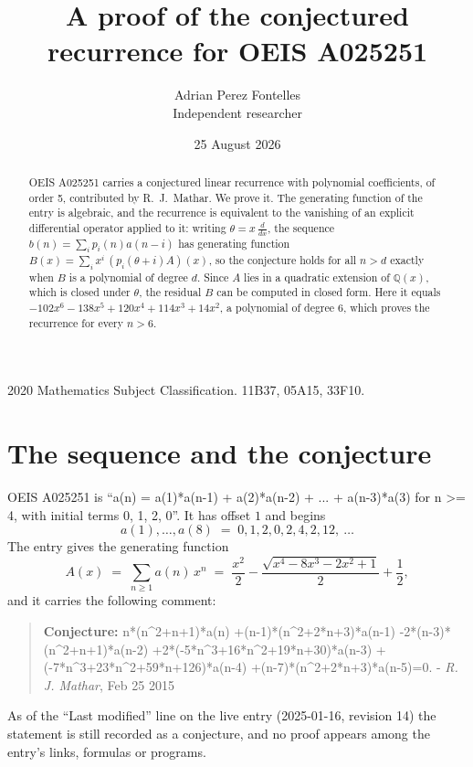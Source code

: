 \documentclass[11pt,a4paper]{article}
\title{A proof of the conjectured recurrence for OEIS A025251}
\author{Adrian Perez Fontelles\\ \small Independent researcher}
\date{25 August 2026}
\theoremstyle{plain}
\theoremstyle{definition}
\begin{document}
\maketitle

\begin{abstract}
OEIS A025251 carries a conjectured linear recurrence with polynomial coefficients, of
order 5, contributed by R.~J.~Mathar. We prove it. The generating function of the
entry is algebraic, and the recurrence is equivalent to the vanishing of an explicit
differential operator applied to it: writing $\theta=x\,\frac{d}{dx}$, the sequence
$b(n)=\sum_{i}p_{i}(n)a(n-i)$ has generating function
$B(x)=\sum_{i}x^{i}\,(p_{i}(\theta+i)A)(x)$, so the conjecture holds for all $n>d$ exactly
when $B$ is a polynomial of degree $d$. Since $A$ lies in a quadratic extension of
$\mathbb{Q}(x)$, which is closed under $\theta$, the residual $B$ can be computed in
closed form. Here it equals $- 102 x^{6} - 138 x^{5} + 120 x^{4} + 114 x^{3} + 14 x^{2}$, a polynomial of degree $6$, which proves
the recurrence for every $n>6$.
\end{abstract}

\noindent\small 2020 Mathematics Subject Classification. 11B37, 05A15, 33F10.\normalsize

\section{The sequence and the conjecture}

OEIS A025251 is ``a(n) = a(1)*a(n-1) + a(2)*a(n-2) + ... + a(n-3)*a(3) for n >= 4, with initial terms 0, 1, 2, 0''. It has offset $1$ and begins
\[
a(1),\dots,a(8)\;=\;0, 1, 2, 0, 2, 4, 2, 12,\ \dots
\]
The entry gives the generating function
\begin{equation}\label{eq:gf}
A(x)\;=\;\sum_{n\ge 1} a(n)\,x^{n}\;=\;\frac{x^{2}}{2} - \frac{\sqrt{x^{4} - 8 x^{3} - 2 x^{2} + 1}}{2} + \frac{1}{2} ,
\end{equation}
and it carries the following comment:
\begin{quote}\small
\textbf{Conjecture:} n*(n\^{}2+n+1)*a(n) +(n-1)*(n\^{}2+2*n+3)*a(n-1) -2*(n-3)*(n\^{}2+n+1)*a(n-2) +2*(-5*n\^{}3+16*n\^{}2+19*n+30)*a(n-3) +(-7*n\^{}3+23*n\^{}2+59*n+126)*a(n-4) +(n-7)*(n\^{}2+2*n+3)*a(n-5)=0. - \emph{R. J. Mathar}, Feb 25 2015
\end{quote}
As of the ``Last modified'' line on the live entry (2025-01-16, revision 14) the
statement is still recorded as a conjecture, and no proof appears among the entry's links,
formulas or programs.
\end{document}
